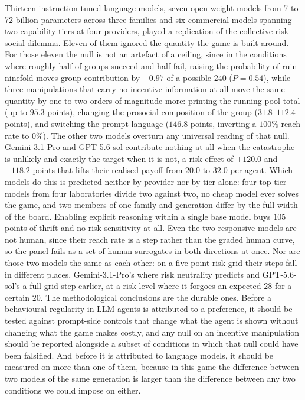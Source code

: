 \documentclass[openacc]{rsproca_new}
\begin{document}
Thirteen instruction-tuned language models, seven open-weight models from 7 to 72 billion parameters across three families and six commercial models spanning two capability tiers at four providers, played a replication of the collective-risk social dilemma. Eleven of them ignored the quantity the game is built around. For those eleven the null is not an artefact of a ceiling, since in the conditions where roughly half of groups succeed and half fail, raising the probability of ruin ninefold moves group contribution by $+0.97$ of a possible $240$ ($P=0.54$), while three manipulations that carry no incentive information at all move the same quantity by one to two orders of magnitude more: printing the running pool total (up to $95.3$ points), changing the prosocial composition of the group ($31.8$--$112.4$ points), and switching the prompt language ($146.8$ points, inverting a $100\%$ reach rate to $0\%$). The other two models overturn any universal reading of that null. Gemini-3.1-Pro and GPT-5.6-sol contribute nothing at all when the catastrophe is unlikely and exactly the target when it is not, a risk effect of $+120.0$ and $+118.2$ points that lifts their realised payoff from $20.0$ to $32.0$ per agent. Which models do this is predicted neither by provider nor by tier alone: four top-tier models from four laboratories divide two against two, no cheap model ever solves the game, and two members of one family and generation differ by the full width of the board. Enabling explicit reasoning within a single base model buys $105$ points of thrift and no risk sensitivity at all. Even the two responsive models are not human, since their reach rate is a step rather than the graded human curve, so the panel fails as a set of human surrogates in both directions at once. Nor are those two models the same as each other: on a five-point risk grid their steps fall in different places, Gemini-3.1-Pro's where risk neutrality predicts and GPT-5.6-sol's a full grid step earlier, at a risk level where it forgoes an expected $28$ for a certain $20$. The methodological conclusions are the durable ones. Before a behavioural regularity in LLM agents is attributed to a preference, it should be tested against prompt-side controls that change what the agent is shown without changing what the game makes costly, and any null on an incentive manipulation should be reported alongside a subset of conditions in which that null could have been falsified. And before it is attributed to language models, it should be measured on more than one of them, because in this game the difference between two models of the same generation is larger than the difference between any two conditions we could impose on either.

\ethics{}

\dataccess{}

\aucontribute{}

\competing{}

\funding{}

\ack{}


\end{document}
